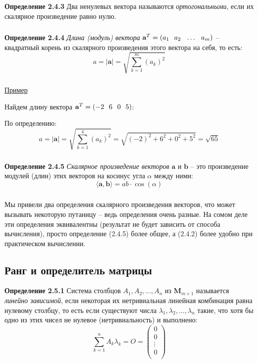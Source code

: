 \documentclass[12pt,a4paper]{article}
\begin{document}
\subparagraph{}
\textbf{Определение 2.4.3} 
Два ненулевых вектора называются \textit{ортогональными}, если их скалярное произведение равно нулю.

\subparagraph{}
\textbf{Определение 2.4.4} 
\textit{Длина (модуль) вектора} $\textbf{a}^T = (a_1 \hspace{7px} a_2 \hspace{7px} \ldots \hspace{7px} a_m)$ -- квадратный корень из скалярного произведения этого вектора на себя, то есть:
\[a = |\textbf{a}| = \sqrt{\sum_{k=1}^m (a_k)^2}\]

\subparagraph{}
\underline{Пример}

Найдем длину вектора $\textbf{a}^T = (-2 \hspace{7px} 6 \hspace{7px} 0 \hspace{7px} 5)$:

По определению:
\[a = |\textbf{a}| = \sqrt{\sum_{k=1}^4 (a_k)^2} = \sqrt{(-2)^2 + 6^2 + 0^2 + 5^2} = \sqrt{65}\]

\subparagraph{}
\textbf{Определение 2.4.5} 
\textit{Скалярное произведение векторов} $\textbf{a}$ и $\textbf{b}$ -- это произведение модулей (длин) этих векторов на косинус угла $\alpha$ между ними:
\[ \langle \textbf{a}, \textbf{b} \rangle = ab \cdot \cos(\alpha)\]

\subparagraph{}
Мы привели два определения скалярного произведения векторов, что может вызывать некоторую путаницу -- ведь определения очень разные. На сомом деле эти определения эквивалентны (результат не будет зависить от способа вычисления), просто определение (2.4.5) более общее, а (2.4.2) более удобно при практическом  вычислении.

\subsection{Ранг и определитель матрицы}
\textbf{Определение 2.5.1} 
Система столбцов $A_1, A_2, \ldots, A_n$ из $\textbf{M}_{m \times 1}$ называется \textit{линейно зависимой}, если  некоторая их нетривиальная линейная комбинация равна нулевому столбцу, то есть 
если существуют числа $\lambda_1, \lambda_2, \ldots, \lambda_n$ такие, что хотя бы одно из этих чисел не нулевое (нетривиальность) и выполнено:
\[ \sum_{k = 1}^n A_k \lambda_k = O = \begin{pmatrix}
0 \\
0 \\
\vdots \\
0 \\
\end{pmatrix}  
\]
\end{document}
